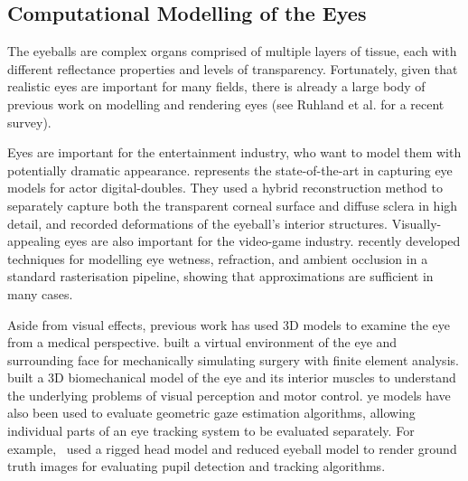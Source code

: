 
\subsection{Computational Modelling of the Eyes}



The eyeballs are complex organs comprised of multiple layers of tissue, each with different reflectance properties and levels of transparency.
Fortunately, given that realistic eyes are important for many fields, there is already a large body of previous work on modelling and rendering eyes (see Ruhland et al. \cite{ruhland2014look} for a recent survey).


Eyes are important for the entertainment industry, who want to model them with potentially dramatic appearance. \citet{berard2014highquality} represents the state-of-the-art in capturing eye models for actor digital-doubles.
They used a hybrid reconstruction method to separately capture both the transparent corneal surface and diffuse sclera in high detail, and recorded deformations of the eyeball's interior structures. Visually-appealing eyes are also important for the video-game industry. \mbox{\citet{ActiBlizEyes}} recently developed techniques for modelling eye wetness, refraction, and ambient occlusion in a standard rasterisation pipeline, showing that approximations are sufficient in many cases.

Aside from visual effects, previous work has used 3D models to examine the eye from a medical perspective.
\citet{sagar1994virtual} built a virtual environment of the eye and surrounding face for mechanically simulating surgery with finite element analysis.
\citet{priamikov14_openeyesim} built a 3D biomechanical model of the eye and its interior muscles to understand the underlying problems of visual perception and motor control.
ye models have also been used to evaluate geometric gaze estimation algorithms, allowing individual parts of an eye tracking system to be evaluated separately.
For example,~\citet{swirski2014rendering} used a rigged head model and reduced eyeball model to render ground truth images for evaluating pupil detection and tracking algorithms.

